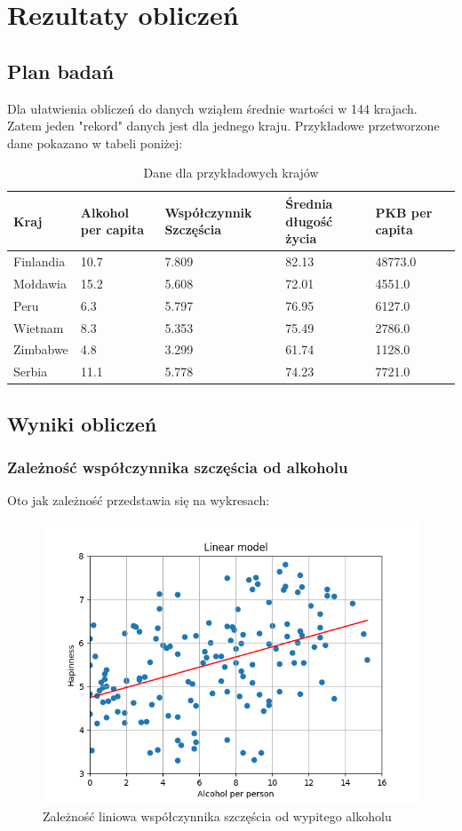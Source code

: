 \documentclass[10pt]{article}
\begin{document}
\section{Rezultaty obliczeń}

\subsection{Plan badań}
Dla ułatwienia obliczeń do danych wziąłem średnie wartości w 144 krajach.
Zatem jeden "rekord" danych jest dla jednego kraju.
Przykładowe przetworzone dane pokazano w tabeli poniżej:

\begin{table}[H]
    \begin{tabular}{|l|l|l|l|l|l|}
    \hline
    \textbf{Kraj}  & \textbf{Alkohol per capita} & \textbf{Współczynnik Szczęścia} & \textbf{Średnia długość życia} & \textbf{PKB per capita} \\ \hline
    Finlandia & 10.7 & 7.809 & 82.13 & 48773.0   \\ \hline
    Mołdawia & 15.2 & 5.608 & 72.01 & 4551.0   \\ \hline
    Peru & 6.3 & 5.797 & 76.95 & 6127.0   \\ \hline
    Wietnam & 8.3 & 5.353 & 75.49 & 2786.0   \\ \hline
    Zimbabwe & 4.8 & 3.299 & 61.74 & 1128.0  \\ \hline
    Serbia & 11.1 & 5.778 & 74.23 & 7721.0   \\ \hline
    \end{tabular}
    \caption{Dane dla przykładowych krajów}
\end{table}

\subsection{Wyniki obliczeń}
\subsubsection{Zależność współczynnika szczęścia od alkoholu}
Oto jak zależność przedstawia się na wykresach:
\begin{figure}[H]
    \begin{center}
        \includegraphics[width=0.8\linewidth]{plots/happiness_dependence_linear.png}
        \caption{Zależność liniowa współczynnika szczęścia od wypitego alkoholu}
    \end{center}
\end{figure}
\end{document}
